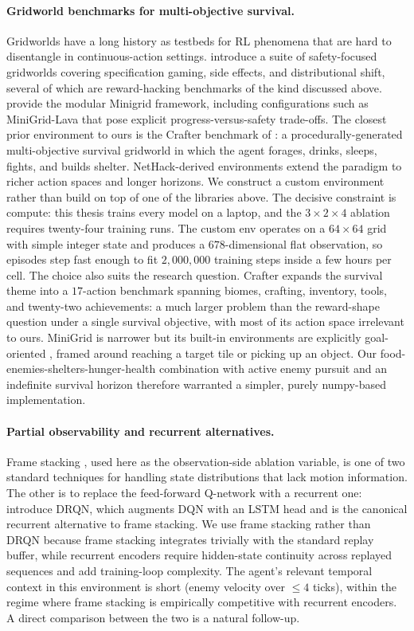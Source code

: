 \documentclass[12pt,a4paper,titlepage]{article}
\begin{document}
\paragraph{Gridworld benchmarks for multi-objective survival.} Gridworlds have a long history as testbeds for RL phenomena that are hard to disentangle in continuous-action settings. \citet{Leike2017} introduce a suite of safety-focused gridworlds covering specification gaming, side effects, and distributional shift, several of which are reward-hacking benchmarks of the kind discussed above. \citet{ChevalierBoisvert2023} provide the modular Minigrid framework, including configurations such as MiniGrid-Lava that pose explicit progress-versus-safety trade-offs. The closest prior environment to ours is the Crafter benchmark of \citet{Hafner2022}: a procedurally-generated multi-objective survival gridworld in which the agent forages, drinks, sleeps, fights, and builds shelter. NetHack-derived environments \citep{Kuttler2020, Samvelyan2021} extend the paradigm to richer action spaces and longer horizons. We construct a custom environment rather than build on top of one of the libraries above. The decisive constraint is compute: this thesis trains every model on a laptop, and the $3 \times 2 \times 4$ ablation requires twenty-four training runs. The custom env operates on a $64 \times 64$ grid with simple integer state and produces a $678$-dimensional flat observation, so episodes step fast enough to fit $2{,}000{,}000$ training steps inside a few hours per cell. The choice also suits the research question. Crafter expands the survival theme into a $17$-action benchmark spanning biomes, crafting, inventory, tools, and twenty-two achievements: a much larger problem than the reward-shape question under a single survival objective, with most of its action space irrelevant to ours. MiniGrid is narrower but its built-in environments are explicitly goal-oriented \citep{ChevalierBoisvert2023}, framed around reaching a target tile or picking up an object. Our food-enemies-shelters-hunger-health combination with active enemy pursuit and an indefinite survival horizon therefore warranted a simpler, purely numpy-based implementation.

\paragraph{Partial observability and recurrent alternatives.} Frame stacking \citep{Mnih2015}, used here as the observation-side ablation variable, is one of two standard techniques for handling state distributions that lack motion information. The other is to replace the feed-forward Q-network with a recurrent one: \citet{Hausknecht2015} introduce DRQN, which augments DQN with an LSTM head and is the canonical recurrent alternative to frame stacking. We use frame stacking rather than DRQN because frame stacking integrates trivially with the standard replay buffer, while recurrent encoders require hidden-state continuity across replayed sequences and add training-loop complexity. The agent's relevant temporal context in this environment is short (enemy velocity over $\leq 4$ ticks), within the regime where frame stacking is empirically competitive with recurrent encoders. A direct comparison between the two is a natural follow-up.
\end{document}
